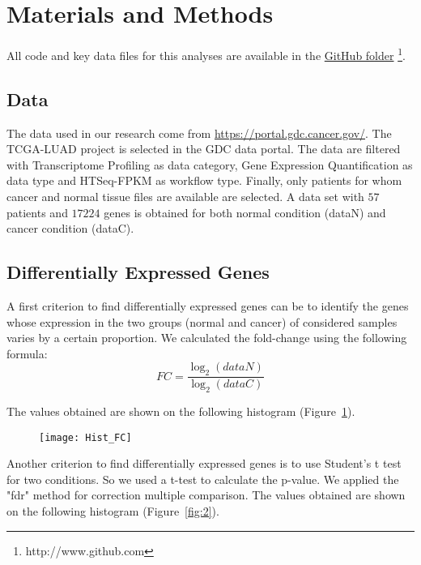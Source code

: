 \documentclass[
10pt, %
a4paper, %
oneside, %
headinclude,footinclude, %
BCOR5mm, %
]{scrartcl}
\begin{document}
\section{Materials and Methods}

All code and key data files for this analyses are available in the \href{http://www.github.com}{GitHub folder} \footnote{http://www.github.com}.


\subsection{Data}
The data used in our research come from \url{https://portal.gdc.cancer.gov/}. The TCGA-LUAD project is selected in the GDC data portal. The data are filtered with Transcriptome Profiling as data category, Gene Expression Quantification as data type and HTSeq-FPKM as workflow type. Finally, only patients for whom cancer and normal tissue files are available are selected. A data set with $57$ patients and $17224$ genes is obtained for both normal condition (dataN) and cancer condition (dataC).


\subsection{Differentially Expressed Genes}
A first criterion to find differentially expressed genes can be to identify the genes whose expression in the two groups (normal and cancer) of considered samples varies by a certain proportion. We calculated the fold-change using the following formula:
$$
FC = \frac{\log_2{(dataN)}}{\log_2{(dataC)}}
$$

The values obtained are shown on the following histogram (Figure~\ref{fig:1}).

\begin{figure}[H]
\centering 
\texttt{[image: Hist\_FC]} 
\caption[]{} %
\label{fig:1} 
\end{figure}
Another criterion to find differentially expressed genes is to use Student’s t test for two conditions.
So we used a t-test to calculate the p-value.
We applied the "fdr" method for correction multiple comparison. 
The values obtained are shown on the following histogram (Figure~\ref{fig:2}).
\end{document}
